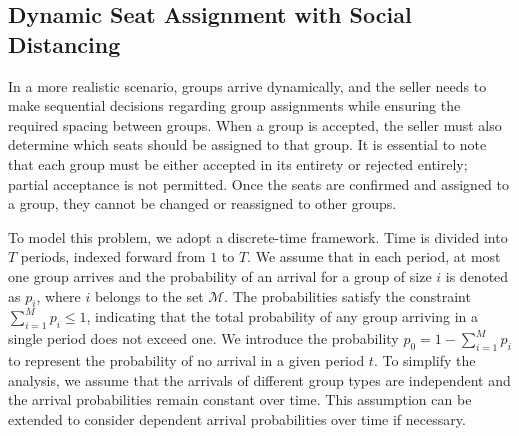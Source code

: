 
\subsection{Dynamic Seat Assignment with Social Distancing}\label{sec_dynamic}
In a more realistic scenario, groups arrive dynamically, and the seller needs to make sequential decisions regarding group assignments while ensuring the required spacing between groups. When a group is accepted, the seller must also determine which seats should be assigned to that group. It is essential to note that each group must be either accepted in its entirety or rejected entirely; partial acceptance is not permitted. Once the seats are confirmed and assigned to a group, they cannot be changed or reassigned to other groups.


To model this problem, we adopt a discrete-time framework. Time is divided into $T$ periods, indexed forward from $1$ to $T$. We assume that in each period, at most one group arrives and the probability of an arrival for a group of size $i$ is denoted as $p_i$, where $i$ belongs to the set $\mathcal{M}$. The probabilities satisfy the constraint $\sum_{i=1}^M p_i \leq 1$, indicating that the total probability of any group arriving in a single period does not exceed one. We introduce the probability $p_0 = 1 - \sum_{i=1}^{M} p_i$ to represent the probability of no arrival in a given period $t$. To simplify the analysis, we assume that the arrivals of different group types are independent and the arrival probabilities remain constant over time. This assumption can be extended to consider dependent arrival probabilities over time if necessary.

